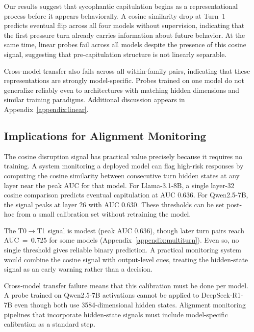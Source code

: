 \documentclass[11pt]{article}
\begin{document}
Our results suggest that sycophantic capitulation begins as a representational
process before it appears behaviorally. A cosine similarity drop at Turn~1
predicts eventual flip across all four models without supervision, indicating
that the first pressure turn already carries information about future behavior.
At the same time, linear probes fail across all models despite the presence of
this cosine signal, suggesting that pre-capitulation structure is not linearly
separable.

Cross-model transfer also fails across all within-family pairs, indicating that
these representations are strongly model-specific. Probes trained on one model
do not generalize reliably even to architectures with matching hidden
dimensions and similar training paradigms. Additional discussion appears in
Appendix~\ref{appendix:linear}.

  \subsection{Implications for Alignment Monitoring}
  \label{subsec:alignment-monitoring}

  The cosine disruption signal has practical value precisely because it requires no
  training. A system monitoring a deployed model can flag high-risk responses by
  computing the cosine similarity between consecutive turn hidden states at any
  layer near the peak AUC for that model. For Llama-3.1-8B, a single layer-32
  cosine comparison predicts eventual capitulation at AUC 0.636. For Qwen2.5-7B,
  the signal peaks at layer 26 with AUC 0.630. These thresholds can be set
  post-hoc from a small calibration set without retraining the model.

  The T0$\rightarrow$T1 signal is modest (peak AUC 0.636), though later turn pairs
  reach AUC~=~0.725 for some models (Appendix~\ref{appendix:multiturn}). Even so,
  no single threshold gives reliable binary prediction.
  A practical monitoring system would combine the cosine signal with output-level
  cues, treating the hidden-state signal as an early warning rather than a decision.

  Cross-model transfer failure means that this calibration must be done per model.
  A probe trained on Qwen2.5-7B activations cannot be applied to DeepSeek-R1-7B
  even though both use 3584-dimensional hidden states. Alignment monitoring
  pipelines that incorporate hidden-state signals must include model-specific
  calibration as a standard step.
\end{document}
